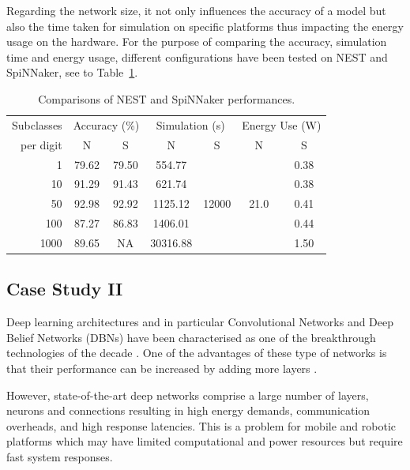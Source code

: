 Regarding the network size, it not only influences the accuracy of a model but also the time taken for simulation on specific platforms thus impacting the energy usage on the hardware.
For the purpose of comparing the accuracy, simulation time and energy usage, different configurations have been tested on NEST and SpiNNaker, see to Table~\ref{tbl:compare}.

\begin{table}[h]
\caption{Comparisons of NEST and SpiNNaker performances.}
\begin{center}
\begin{tabular} {r|c|c|c|c|c|c}
	 Subclasses
	 &\multicolumn{2}{c|}{Accuracy (\%)}  &\multicolumn{2}{c|}{Simulation (s)}
	 &\multicolumn{2}{c}{Energy Use (W)}   \\
	 \cline{2-7}
	 per digit
	& N & S & N & S & N & S\\
    \hline
    1 & 79.62 & 79.50 & 554.77 & \multirow{5}{*}{12000} & \multirow{5}{*}{ 21.0 } & 0.38 \\
    10 & 91.29 & 91.43 & 621.74 &   &   & 0.38 \\
    50 & 92.98 & 92.92 & 1125.12 &   &   & 0.41 \\
    100 & 87.27 & 86.83 & 1406.01 &   &   & 0.44 \\
    1000 & 89.65 & NA & 30316.88 &   &   & 1.50 \\

\end{tabular}
\label{tbl:compare}
\end{center}
\end{table}


\subsection{Case Study II}
Deep learning architectures and in particular Convolutional Networks \citep{lecun1998gradient} and Deep Belief Networks (DBNs) \citep{Hinton_etal_2006} have been characterised as one of the breakthrough technologies of the decade \citep{MIT_TechReview}. One of the advantages of these type of networks is that their performance can be increased by adding more layers \citep{Hinton_Contr_Divergence2006}.

However, state-of-the-art deep networks comprise a large number of layers, neurons and connections resulting in high energy demands, communication overheads, and high response latencies. This is a problem for mobile and robotic platforms which may have limited computational and power resources but require fast system responses. 


